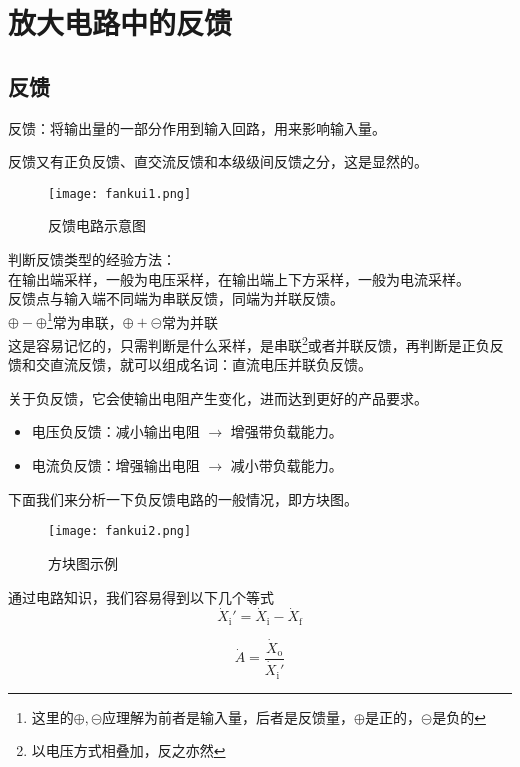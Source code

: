 \documentclass[cn,pad,11pt,geye]{elegantnote}
\begin{document}
\section{放大电路中的反馈}
\subsection{反馈}
\begin{definition}
	反馈：将输出量的一部分作用到输入回路，用来影响输入量。
\end{definition}
\begin{note}
	反馈又有正负反馈、直交流反馈和本级级间反馈之分，这是显然的。
\end{note}
\begin{figure}[h]
	\centering
	\texttt{[image: fankui1.png]}
	\caption{反馈电路示意图}
\end{figure}
\begin{note}
	判断反馈类型的经验方法：\\
	在输出端采样，一般为电压采样，在输出端上下方采样，一般为电流采样。\\
	反馈点与输入端不同端为串联反馈，同端为并联反馈。\\
	$\oplus-\oplus$\footnote{这里的$\oplus,\circleddash$应理解为前者是输入量，后者是反馈量，$\oplus$是正的，$\circleddash$是负的}常为串联，$\oplus+\circleddash$常为并联\\
	这是容易记忆的，只需判断是什么采样，是串联\footnote{以电压方式相叠加，反之亦然}或者并联反馈，再判断是正负反馈和交直流反馈，就可以组成名词：直流电压并联负反馈。
\end{note}
\begin{proposition}[关于负反馈]
	关于负反馈，它会使输出电阻产生变化，进而达到更好的产品要求。
	\begin{itemize}
		\item 电压负反馈：减小输出电阻 $\to$ 增强带负载能力。
		\item 电流负反馈：增强输出电阻 $\to$ 减小带负载能力。
	\end{itemize}
\end{proposition}

下面我们来分析一下负反馈电路的一般情况，即方块图。
\begin{figure}[h]
	\centering
	\texttt{[image: fankui2.png]}
	\caption{方块图示例}
\end{figure}

通过电路知识，我们容易得到以下几个等式
\begin{equation*}
	\dot X_\mathrm{i}'=\dot X_\mathrm{i}-\dot X_\mathrm{f}
\end{equation*}
\begin{definition}[放大倍数]
	\begin{equation*}
		\dot{A}=\frac{\dot{X}_{\mathrm{o}}}{\dot{X}_{\mathrm{i}}'}
	\end{equation*}
	
\end{definition}
\end{document}
